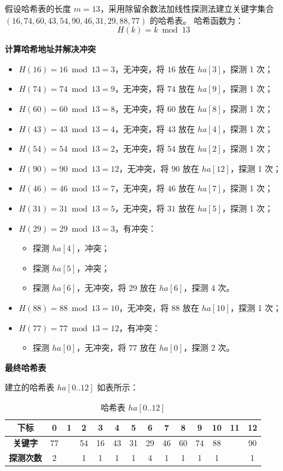\documentclass[lang=cn,newtx,10pt,scheme=chinese]{../elegantbook}
\begin{document}
假设哈希表的长度 $m = 13$，采用除留余数法加线性探测法建立关键字集合 $(16, 74, 60, 43, 54, 90, 46, 31, 29, 88, 77)$ 的哈希表。  
哈希函数为：
\[
H(k) = k \bmod 13
\]


\textbf{计算哈希地址并解决冲突}  

\begin{itemize}
  \item $H(16) = 16 \bmod 13 = 3$，无冲突，将 $16$ 放在 $ha[3]$，探测 1 次；
  \item $H(74) = 74 \bmod 13 = 9$，无冲突，将 $74$ 放在 $ha[9]$，探测 1 次；
  \item $H(60) = 60 \bmod 13 = 8$，无冲突，将 $60$ 放在 $ha[8]$，探测 1 次；
  \item $H(43) = 43 \bmod 13 = 4$，无冲突，将 $43$ 放在 $ha[4]$，探测 1 次；
  \item $H(54) = 54 \bmod 13 = 2$，无冲突，将 $54$ 放在 $ha[2]$，探测 1 次；
  \item $H(90) = 90 \bmod 13 = 12$，无冲突，将 $90$ 放在 $ha[12]$，探测 1 次；
  \item $H(46) = 46 \bmod 13 = 7$，无冲突，将 $46$ 放在 $ha[7]$，探测 1 次；
  \item $H(31) = 31 \bmod 13 = 5$，无冲突，将 $31$ 放在 $ha[5]$，探测 1 次；
  \item $H(29) = 29 \bmod 13 = 3$，有冲突：
    \begin{itemize}
      \item 探测 $ha[4]$，冲突；
      \item 探测 $ha[5]$，冲突；
      \item 探测 $ha[6]$，无冲突，将 $29$ 放在 $ha[6]$，探测 4 次。
    \end{itemize}
  \item $H(88) = 88 \bmod 13 = 10$，无冲突，将 $88$ 放在 $ha[10]$，探测 1 次；
  \item $H(77) = 77 \bmod 13 = 12$，有冲突：
    \begin{itemize}
      \item 探测 $ha[0]$，无冲突，将 $77$ 放在 $ha[0]$，探测 2 次。
    \end{itemize}
\end{itemize}


\textbf{最终哈希表}  

建立的哈希表 $ha[0..12]$ 如表所示：

\begin{table}[h!]
  \centering
  \caption{哈希表 $ha[0..12]$}
  \begin{tabular}{|c|c|c|c|c|c|c|c|c|c|c|c|c|c|}
  \hline
  \textbf{下标}     & 0  & 1  & 2  & 3  & 4  & 5  & 6  & 7  & 8  & 9  & 10 & 11 & 12 \\ \hline
  \textbf{关键字}   & 77 &    & 54 & 16 & 43 & 31 & 29 & 46 & 60 & 74 & 88 &    & 90 \\ \hline
  \textbf{探测次数} & 2  &    & 1  & 1  & 1  & 1  & 4  & 1  & 1  & 1  & 1  &    & 1  \\ \hline
  \end{tabular}
\end{table}
\end{document}
